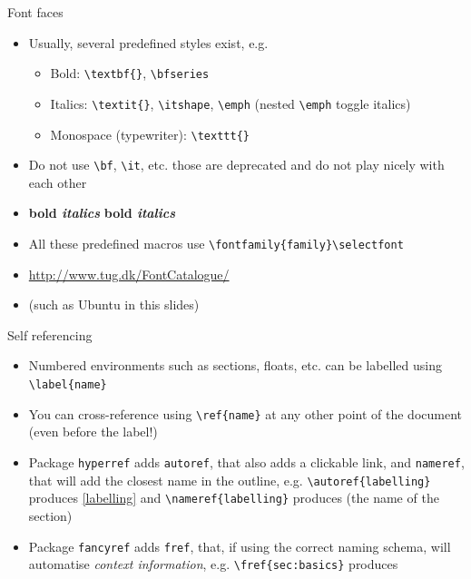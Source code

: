 \documentclass[english]{beamer}
\let\olditem\item
\renewcommand{\item}{\setlength{\itemsep}{\fill}\olditem}
\newenvironment{sitemize}{\let\item\olditem \begin{itemize}}{\vfill\end{itemize}}
\let\textttt\texttt
\renewcommand{\texttt}[1]{\colorbox{gray!10}{\textttt{#1}}}
\begin{document}
\begin{frame}[fragile]{Font faces}
    \begin{itemize}
        \item Usually, several predefined styles exist, e.g.
        \begin{sitemize}
            \item Bold: \verb|\textbf{}|, \verb|\bfseries|
            \item Italics: \verb|\textit{}|, \verb|\itshape|, \verb|\emph| (nested \verb|\emph| toggle italics)
            \item Monospace (typewriter): \verb|\texttt{}|
        \end{sitemize}
        
        \item Do not use \verb|\bf|, \verb|\it|, etc. those are deprecated and do not play nicely with each other
        
        \item {\bf bold {\it italics}} {\bfseries bold {\itshape{italics}}}
        
        \item All these predefined macros use \verb|\fontfamily{family}\selectfont|
        \item \url{http://www.tug.dk/FontCatalogue/}
        \item \hyperlink{sld_font}{} (such as Ubuntu in this slides)
    \end{itemize}
\end{frame}

\begin{frame}[fragile]{Self referencing}
    \label{labelling}
    \begin{itemize}
        \item Numbered environments such as sections, floats, etc. can be labelled using \verb|\label{name}|
        \item You can cross-reference using \verb|\ref{name}| at any other point of the document (even before the label!) 
        \item Package \texttt{hyperref} adds \texttt{autoref}, that also adds a clickable link, and \texttt{nameref}, that will add the closest name in the outline, e.g. \verb|\autoref{labelling}| produces \autoref{labelling} and \verb|\nameref{labelling}| produces  (the name of the section)
        \item Package \texttt{fancyref} adds \texttt{fref}, that, if using the correct naming schema, will automatise \emph{context information}, e.g. \verb|\fref{sec:basics}| produces 
    \end{itemize}
\end{frame}
\end{document}
